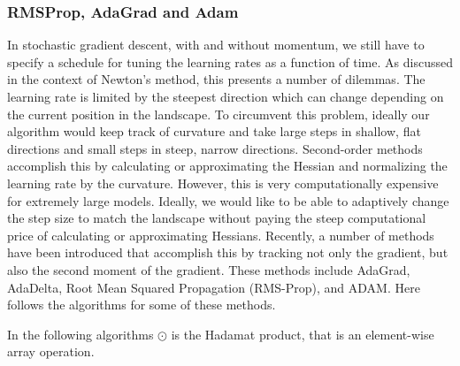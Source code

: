 \subsubsection{RMSProp, AdaGrad and Adam}
In stochastic gradient descent, with and without momentum, we still have to
specify a schedule for tuning the learning rates as a function of time.
As discussed in the context of Newton's method, this presents a number of dilemmas.
The learning rate is limited by the steepest direction which can change
depending on the current position in the landscape.
To circumvent this problem, ideally our algorithm would keep track of curvature
and take large steps in shallow, flat directions and small steps in steep,
narrow directions. Second-order methods accomplish this by calculating or
approximating the Hessian and normalizing the learning rate by the curvature.
However, this is very computationally expensive for extremely large models.
Ideally, we would like to be able to adaptively change the step size to match
the landscape without paying the steep computational price of calculating or
approximating Hessians. Recently, a number of methods have been introduced that
accomplish this by tracking not only the gradient, but also the second moment
of the gradient. These methods include AdaGrad, AdaDelta, Root Mean Squared
Propagation (RMS-Prop), and ADAM. Here follows the algorithms for some of these
methods.

In the following algorithms $\odot$ is the Hadamat product, that is an
element-wise array operation.

